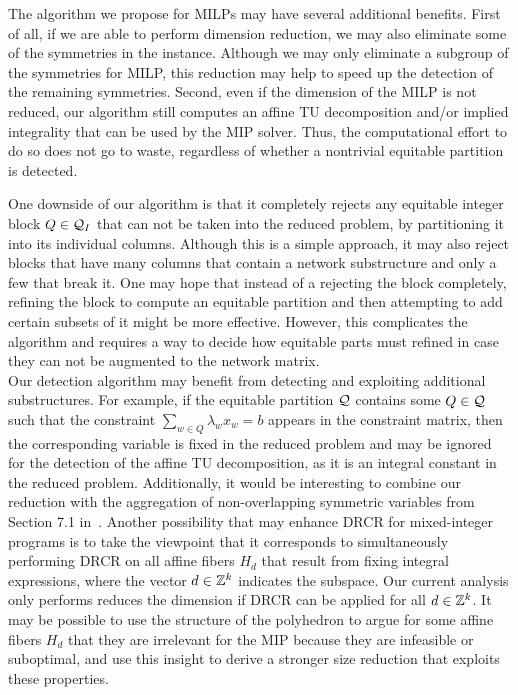 \documentclass[pdflatex,sn-mathphys-num]{sn-jnl}%
\theoremstyle{thmstyleone}%
\theoremstyle{thmstylethree}%
\theoremstyle{thmstyletwo}%
\begin{document}
The algorithm we propose for MILPs may have several additional benefits. First of all, if we are able to perform dimension reduction, we may also eliminate some of the symmetries in the instance. Although we may only eliminate a subgroup of the symmetries for MILP, this reduction may help to speed up the detection of the remaining symmetries.
Second, even if the dimension of the MILP is not reduced, our algorithm still computes an affine TU decomposition and/or implied integrality that can be used by the MIP solver. Thus, the computational effort to do so does not go to waste, regardless of whether a nontrivial equitable partition is detected.

One downside of our algorithm is that it completely rejects any equitable integer block $Q\in \mathcal{Q}_I$ that can not be taken into the reduced problem, by partitioning it into its individual columns. Although this is a simple approach, it may also reject blocks that have many columns that contain a network substructure and only a few that break it. One may hope that instead of a rejecting the block completely, refining the block to compute an equitable partition and then attempting to add certain subsets of it might be more effective. However, this complicates the algorithm and requires a way to decide how equitable parts must refined in case they can not be augmented to the network matrix. \\

Our detection algorithm may benefit from detecting and exploiting additional substructures. For example, if the equitable partition $\mathcal{Q}$ contains some $Q\in \mathcal{Q}$ such that the constraint $\sum_{w\in Q} \lambda_w x_w = b$ appears in the constraint matrix, then the corresponding variable is fixed in the reduced problem and may be ignored for the detection of the affine TU decomposition, as it is an integral constant in the reduced problem.
Additionally, it would be interesting to combine our reduction with the aggregation of non-overlapping symmetric variables from Section 7.1 in~\cite{Achterberg2016}.
Another possibility that may enhance DRCR for mixed-integer programs is to take the viewpoint that it corresponds to simultaneously performing DRCR on all affine fibers $H_d$ that result from fixing integral expressions, where the vector $d\in \mathbb{Z}^k$ indicates the subspace. Our current analysis only performs reduces the dimension if DRCR can be applied for all $d\in \mathbb{Z}^k$. It may be possible to use the structure of the polyhedron to argue for some affine fibers $H_d$ that they are irrelevant for the MIP because they are infeasible or suboptimal, and use this insight to derive a stronger size reduction that exploits these properties. \\
\end{document}

